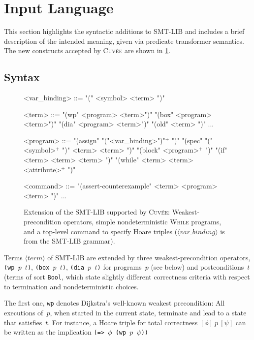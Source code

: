 \documentclass[fleqn]{llncs}
\newcommand{\Cuvee}{\textsc{Cuvée}\xspace}
\newcommand{\code}[1]{\texttt{#1}}
\newcommand{\hoaretotal}[3]{[ #1 ]~#2~[ #3 ]}
\newcommand{\nonterminal}[1]{\ensuremath{\langle \mathit{#1} \rangle}}
\begin{document}
\section{Input Language}
\label{sec:language}

This section highlights the syntactic additions to SMT-LIB and includes a brief description of the intended meaning,
given via predicate transformer semantics.
The new constructs accepted by \Cuvee are shown in \cref{fig:syntax}.

\subsection{Syntax}
\label{sec:syntax}

\begin{figure}[t]
    \begin{grammar}
    <var_binding>
        ::= "(" <symbol> <term> ")"

    <term>
        ::=  "(wp" <program> <term>")"
        \alt "(box" <program> <term>")"
        \alt "(dia" <program> <term>")"
        \alt "(old" <term> ")"
        \alt ...

    <program>
        ::=  "(assign" "("<var_binding>")"$^+$ ")"
        \alt "(spec"   "(" <symbol>$^+$ ")" <term> <term> ")"
        \alt "(block"  <program>$^+$ ")"
        \alt "(if"     <term> <term> <term> ")"
        \alt "(while"  <term> <term> <attribute>$^+$ ")"

    <command>
        ::=  "(assert-counterexample" <term> <program> <term> ")"
        \alt ...
    \end{grammar}
    \caption{Extension of the SMT-LIB supported by \Cuvee:
             Weakest-precondition operators,
             simple nondeterministic \textsc{While} programs,
             and a top-level command to specify Hoare triples
             (\nonterminal{var\_binding} is from the SMT-LIB grammar).}
    \label{fig:syntax}
\end{figure}

Terms \nonterminal{term} of SMT-LIB are extended by three weakest-precondition operators,
\code{(wp  $p$ $t$)}, \code{(box $p$ $t$)}, \code{(dia $p$ $t$)}
for programs~$p$ (see below)
and postconditions~$t$ (terms of sort \code{Bool},
which state slightly different correctness criteria with respect to termination and nondeterministic choices.

The first one, \code{wp} denotes Dijkstra's well-known weakest precondition:
All executions of~$p$, when started in the current state, terminate and lead to a state that satisfies~$t$.
For instance, a Hoare triple for total correctness $\hoaretotal{\phi}{p}{\psi}$ can be written as the implication \code{(=> $\phi$ (wp $p$ $\psi$))}
\end{document}
